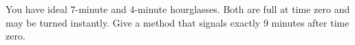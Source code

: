 You have ideal 7-minute and 4-minute hourglasses. Both are full at time zero and may be turned instantly. Give a method that signals exactly 9 minutes after time zero.
